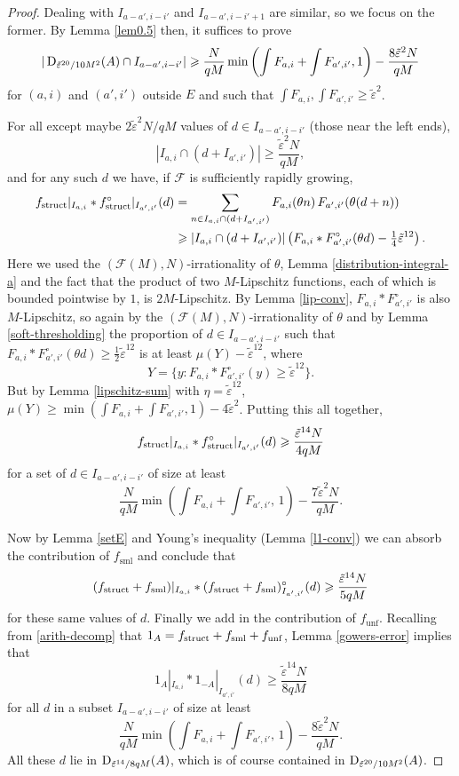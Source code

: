 \documentclass[10pt,reqno]{amsart}
\theoremstyle{definition}
\theoremstyle{remark}
\renewcommand{\geq}{\geqslant}
\newcommand\sml{\operatorname{sml}}
\newcommand\unf{\operatorname{unf}}
\def\eps{\varepsilon}
\numberwithin{equation}{section}
\begin{document}
\begin{proof}
Dealing with $I_{a-a',i-i'}$ and $I_{a-a',i-i'+1}$ are similar, so we focus on the former. By Lemma \ref{lem0.5} then, it suffices to prove 
\[ |\Sym_{{\tilde\eps}^{20}/10M^2}(A) \cap I_{a-a',i-i'}| \geq \frac{N}{qM} \min\left( \int F_{a,i} + \int F_{a',i'}, 1\right)- \frac{8{\tilde\eps}^2 N}{qM}\] for $(a,i)$ and $(a',i')$ outside $E$ and such that $\int F_{a,i}, \int F_{a',i'} \geq {\tilde\eps}^2$.

For all except maybe $2{\tilde\eps}^2 N/qM$ values of $d \in I_{a-a',i-i'}$ (those near the left ends),
\begin{equation}\label{not-endpoint} |I_{a,i} \cap (d + I_{a',i'})| \geq \frac{{\tilde\eps}^2 N}{qM}, \end{equation}
and for any such $d$ we have, if $\mathcal{F}$ is sufficiently rapidly growing,
\begin{align}
\nonumber f_{\struct}|_{I_{a,i}} \ast f^{\circ}_{\struct}|_{I_{a',i'}}(d)
 & = \sum_{n \in I_{a,i} \cap(d + I_{a',i'})} F_{a,i}(\theta n)\, F_{a',i'}(\theta (d+n)) \\
 & \geq |I_{a,i} \cap (d + I_{a',i'})| \left(F_{a,i} \ast F^{\circ}_{a',i'}(\theta d) - \tfrac{1}{4}{\tilde\eps}^{12}\right).\label{eq7}
\end{align}
Here we used the $(\mathcal{F}(M),N)$-irrationality of $\theta$, Lemma \ref{distribution-integral-a} and the fact that the product of two $M$-Lipschitz functions, each of which is bounded pointwise by $1$, is $2M$-Lipschitz. By Lemma \ref{lip-conv}, $F_{a,i}\ast F^\circ_{a',i'}$ is also $M$-Lipschitz, so again by the $(\mathcal{F}(M),N)$-irrationality of $\theta$ and by Lemma \ref{soft-thresholding} the proportion of $d\in I_{a-a',i-i'}$ such that $F_{a,i}\ast F^{\circ}_{a',i'}(\theta d) \geq \tfrac{1}{2}{\tilde\eps}^{12}$ is at least $\mu(Y) - {\tilde\eps}^{12}$, where \[Y=\{y : F_{a,i}\ast F^\circ_{a',i'}(y)\geq{\tilde\eps}^{12}\}.\] But by Lemma \ref{lipschitz-sum} with $\eta={\tilde\eps}^{12}$, $\mu(Y) \geq \min\left(\int F_{a,i} + \int F_{a',i'},1\right) - 4{\tilde\eps}^2$. Putting this all together, \[f_{\struct}|_{I_{a,i}}\ast f^\circ_{\struct}|_{I_{a',i'}}(d) \geq \frac{{\tilde\eps}^{14} N}{4qM}\] for a set of $d\in I_{a-a',i-i'}$ of size at least \[\frac{N}{qM} \min\left(\int F_{a,i} + \int F_{a',i'},\, 1\right) - \frac{7{\tilde\eps}^2 N}{qM}.\]

Now by Lemma \ref{setE} and Young's inequality (Lemma \ref{l1-conv}) we can absorb the contribution of $f_{\sml}$ and conclude that 
\[ (f_{\struct} + f_{\sml})|_{I_{a,i}} \ast (f_{\struct} + f_{\sml})^{\circ}_{I_{a',i'}} (d) \geq \frac{{\tilde\eps}^{14} N}{5qM}\] for these same values of $d$. Finally we add in the contribution of $f_{\unf}$. Recalling from \eqref{arith-decomp} that $1_A = f_{\struct} + f_{\sml} + f_{\unf}$, Lemma \ref{gowers-error} implies that
\[ 1_A|_{I_{a,i}} \ast 1_{-A}|_{I_{a',i'}}(d) \geq \frac{{\tilde\eps}^{14} N}{8qM}\] for all $d$ in a subset $I_{a-a',i-i'}$ of size at least
\[\frac{N}{qM} \min\left(\int F_{a,i} + \int F_{a',i'},\, 1\right) - \frac{8{\tilde\eps}^2 N}{qM}.\]
All these $d$ lie in $\Sym_{{\tilde\eps}^{14}/8qM}(A)$, which is of course contained in $\Sym_{{\tilde\eps}^{20}/10M^2}(A)$.\end{proof}
\end{document}
